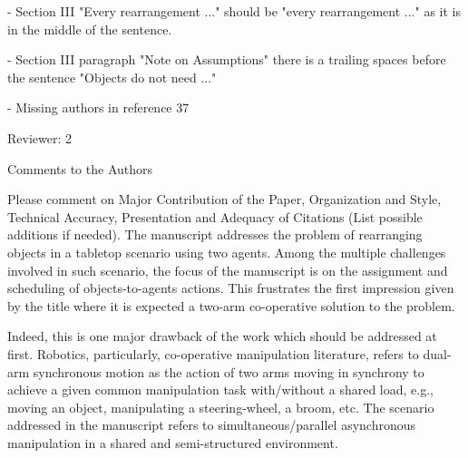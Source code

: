 \documentclass[journal]{IEEEtran}
\begin{document}
	\begin{partt}
		
		- Section III "Every rearrangement ..." should be "every rearrangement ..." as it is in the middle of the sentence.
	\end{partt}
	\begin{partt}
		
		- Section III paragraph "Note on Assumptions" there is a trailing spaces before the sentence  "Objects do not need ..."
	\end{partt}
	\begin{partt}
		
		- Missing authors in reference 37
	\end{partt}

	\begin{partt}
		Reviewer: 2
		
		Comments to the Authors
		
		Please comment on Major Contribution of the Paper, Organization and Style, Technical Accuracy, Presentation and Adequacy of Citations (List possible additions if needed).
		The manuscript addresses the problem of rearranging objects in a tabletop scenario using two agents. Among the multiple challenges involved in such scenario, the focus of the manuscript is on the assignment and scheduling of objects-to-agents actions. This frustrates the first impression given by the title where it is expected a two-arm co-operative solution to the problem.
	\end{partt}
	
	\begin{partt}
		Indeed, this is one major drawback of the work which should be addressed at first. Robotics, particularly, co-operative manipulation literature, refers to dual-arm synchronous motion as the action of two arms moving in synchrony to achieve a given common manipulation task with/without a shared load, e.g., moving an object, manipulating a steering-wheel, a broom, etc. The scenario addressed in the manuscript refers to simultaneous/parallel asynchronous manipulation in a shared and semi-structured environment.  
	\end{partt}
	
\end{document}
